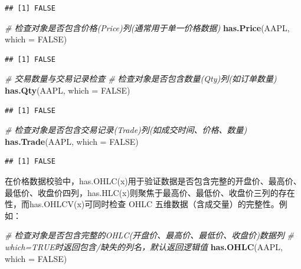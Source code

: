 \documentclass[]{ctexbook}
\newenvironment{Shaded}{\begin{snugshade}}{\end{snugshade}}
\newcommand{\AttributeTok}[1]{\textcolor[rgb]{0.13,0.29,0.53}{#1}}
\newcommand{\CommentTok}[1]{\textcolor[rgb]{0.56,0.35,0.01}{\textit{#1}}}
\newcommand{\ConstantTok}[1]{\textcolor[rgb]{0.56,0.35,0.01}{#1}}
\newcommand{\FunctionTok}[1]{\textcolor[rgb]{0.13,0.29,0.53}{\textbf{#1}}}
\newcommand{\NormalTok}[1]{#1}
\begin{document}
\begin{verbatim}
## [1] FALSE
\end{verbatim}

\begin{Shaded}
\begin{Highlighting}[]
\CommentTok{\# 检查对象是否包含价格(Price)列(通常用于单一价格数据)}
\FunctionTok{has.Price}\NormalTok{(AAPL, }\AttributeTok{which =} \ConstantTok{FALSE}\NormalTok{)}
\end{Highlighting}
\end{Shaded}

\begin{verbatim}
## [1] FALSE
\end{verbatim}

\begin{Shaded}
\begin{Highlighting}[]
\CommentTok{\# 交易数量与交易记录检查}
\CommentTok{\# 检查对象是否包含数量(Qty)列(如订单数量)}
\FunctionTok{has.Qty}\NormalTok{(AAPL, }\AttributeTok{which =} \ConstantTok{FALSE}\NormalTok{)}
\end{Highlighting}
\end{Shaded}

\begin{verbatim}
## [1] FALSE
\end{verbatim}

\begin{Shaded}
\begin{Highlighting}[]
\CommentTok{\# 检查对象是否包含交易记录(Trade)列(如成交时间、价格、数量)}
\FunctionTok{has.Trade}\NormalTok{(AAPL, }\AttributeTok{which =} \ConstantTok{FALSE}\NormalTok{)}
\end{Highlighting}
\end{Shaded}

\begin{verbatim}
## [1] FALSE
\end{verbatim}

在价格数据校验中，has.OHLC(x)用于验证数据是否包含完整的开盘价、最高价、最低价、收盘价四列，has.HLC(x)则聚焦于最高价、最低价、收盘价三列的存在性，而has.OHLCV(x)可同时检查 OHLC 五维数据（含成交量）的完整性。例如：

\begin{Shaded}
\begin{Highlighting}[]
\CommentTok{\# 检查对象是否包含完整的OHLC(开盘价、最高价、最低价、收盘价)数据列}
\CommentTok{\# which=TRUE时返回包含/缺失的列名，默认返回逻辑值}
\FunctionTok{has.OHLC}\NormalTok{(AAPL, }\AttributeTok{which =} \ConstantTok{FALSE}\NormalTok{)}
\end{Highlighting}
\end{Shaded}
\end{document}
